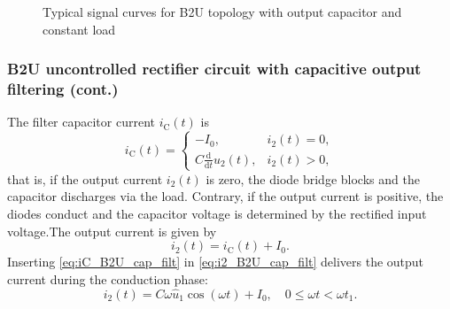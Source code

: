 \begin{frame}
\begin{figure}
        \caption{Typical signal curves for B2U topology with output capacitor and constant load}
        \label{fig:B2U_topology_capacitive_filter_signals}
    \end{figure}
\end{frame}

\begin{frame}
    \frametitle{B2U uncontrolled rectifier circuit with capacitive output filtering (cont.)}
    The filter capacitor current $i_\mathrm{C}(t)$ is
    \begin{equation}
        i_\mathrm{C}(t) = \begin{cases}
            -I_0, & i_2(t) = 0,\\
            C\frac{\mathrm{d}}{\mathrm{d}t}u_2(t), & i_2(t) > 0,
        \end{cases}
        \label{eq:iC_B2U_cap_filt}
    \end{equation}
    that is, if the output current $i_2(t)$ is zero, the diode bridge blocks and the capacitor discharges via the load. Contrary, if the output current is positive, the diodes conduct and the capacitor voltage is determined by the rectified input voltage.\pause The output current is given by
    \begin{equation}
        i_2(t) = i_\mathrm{C}(t) + I_0.
        \label{eq:i2_B2U_cap_filt}
    \end{equation} \pause
    Inserting \eqref{eq:iC_B2U_cap_filt} in \eqref{eq:i2_B2U_cap_filt} delivers the output current during the conduction phase:
    \begin{equation}
        i_2(t) = C\omega \hat{u}_1 \cos(\omega t) + I_0, \quad 0 \leq \omega t < \omega t_1.
        \label{eq:i2_B2U_cap_filt_conduct}
    \end{equation}
\end{frame}

